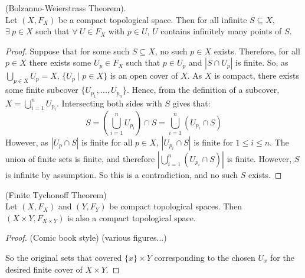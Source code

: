 \begin{theorem}
	(Bolzanno-Weierstrass Theorem).\\
	Let $(X,F_X)$ be a compact topological space. Then for all infinite $S \subseteq X$, $\exists \ p \in X$ such that $\forall \ U \in F_X$ with $p \in U$, $U$ contains infinitely many points of $S$. 
\end{theorem}
\begin{proof}
	Suppose that for some such $S \subseteq X$, no such $p \in X$ exists. Therefore, for all $p \in X$ there exists some $U_p \in F_X$ such that $p \in U_p$ and $|S \cap U_p|$ is finite. So, as $\displaystyle{\bigcup_{p \in X} U_p = X}$, $\{U_p \mid p \in X\}$ is an open cover of $X$. As $X$ is compact, there exists some finite subcover $\{U_{p_1},...,U_{p_n}\}$. Hence, from the definition of a subcover, $\displaystyle{X = \bigcup_{i=1}^n U_{p_i}}$. Intersecting both sides with $S$ gives that:
	\[S = \left(\bigcup_{i=1}^n U_{p_i}\right) \cap S = \bigcup_{i=1}^n (U_{p_i} \cap S)\]
	However, as $|U_p \cap S|$ is finite for all $p \in X$, $|U_{p_i} \cap S|$ is finite for $1 \leq i \leq n$. The union of finite sets is finite, and therefore $\left|\bigcup_{i=1}^n (U_{p_i} \cap S)\right|$ is finite. However, $S$ is infinite by assumption. So this is a contradiction, and no such $S$ exists. 
\end{proof}
\begin{theorem}
	(Finite Tychonoff Theorem) \\
	Let $(X,F_X)$ and $(Y,F_Y)$ be compact topological spaces. Then $(X \times Y, F_{X \times Y})$ is also a compact topological space. 
\end{theorem}
\begin{proof}
	(Comic book style) (various figures...) \placeholder
	
	So the original sets that covered $\{x\} \times Y$ corresponding to the chosen $U_x$ for the desired finite cover of $X \times Y$. 
\end{proof}
